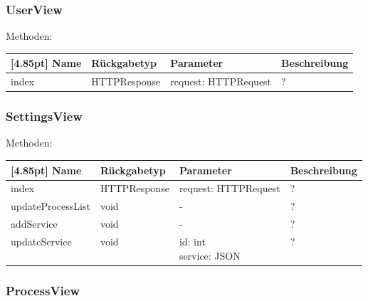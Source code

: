 		\subsubsection{UserView}
		
		Methoden:
		\begin{center}
		    \setlength\tabcolsep{5pt}
        	\renewcommand{\arraystretch}{1.5}
            	\begin{tabularx}{\textwidth}{|l|l|l|X|}
            	\hline
            	\rowcolor[gray]{0.75}[4.85pt]
        		Name & Rückgabetyp & Parameter & Beschreibung \\ \hline 
                index & HTTPResponse & request: HTTPRequest & ? \\ \hline
            	\end{tabularx}
		\end{center}
		
		\subsubsection{SettingsView}
		
		Methoden:
		\begin{center}
		    \setlength\tabcolsep{5pt}
        	\renewcommand{\arraystretch}{1.5}
            	\begin{tabularx}{\textwidth}{|l|l|l|X|}
            	\hline
            	\rowcolor[gray]{0.75}[4.85pt]
        		Name & Rückgabetyp & Parameter & Beschreibung \\ \hline 
                index & HTTPResponse & request: HTTPRequest & ? \\ \hline
                updateProcessList & void & - & ? \\ \hline
                addService & void & - & ? \\ \hline
                updateService & void & \thead{id: int\\service: JSON} & ? \\ \hline
            	\end{tabularx}
		\end{center}
		
		\subsubsection{ProcessView}
		
